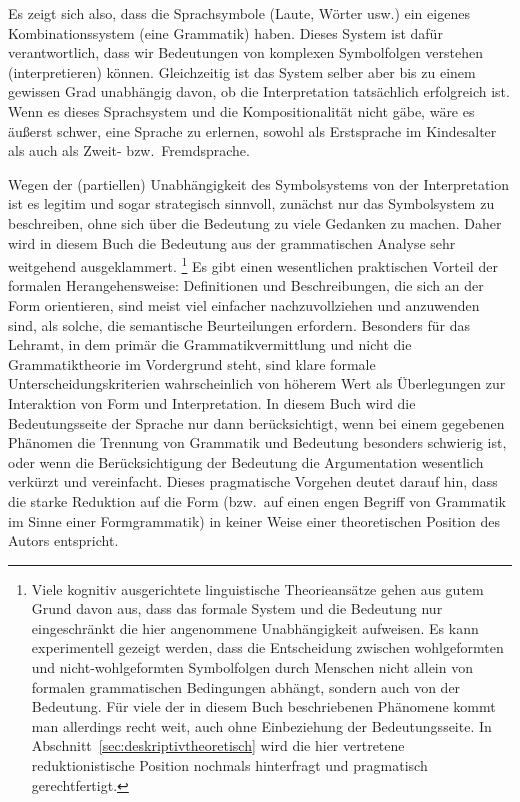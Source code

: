 \begin{exe}
  \ex\label{ex:dg7718}
  \begin{xlist}
  \end{xlist}
\end{exe}

Es zeigt sich also, dass die Sprachsymbole (Laute, Wörter usw.) ein eigenes Kombinationssystem (eine Grammatik) haben.
Dieses System ist dafür verantwortlich, dass wir Bedeutungen von komplexen Symbolfolgen verstehen (interpretieren) können.
Gleichzeitig ist das System selber aber bis zu einem gewissen Grad unabhängig davon, ob die Interpretation tatsächlich erfolgreich ist.
Wenn es dieses Sprachsystem und die Kompositionalität nicht gäbe, wäre es äußerst schwer, eine Sprache zu erlernen, sowohl als Erstsprache im Kindesalter als auch als Zweit- bzw.\ Fremdsprache.

Wegen der (partiellen) Unabhängigkeit des Symbolsystems von der Interpretation ist es legitim und sogar strategisch sinnvoll, zunächst nur das Symbolsystem zu beschreiben, ohne sich über die Bedeutung zu viele Gedanken zu machen.
Daher wird in diesem Buch die Bedeutung aus der grammatischen Analyse sehr weitgehend ausgeklammert.%
\footnote{Viele kognitiv ausgerichtete linguistische Theorieansätze gehen aus gutem Grund davon aus, dass das formale System und die Bedeutung nur eingeschränkt die hier angenommene Unabhängigkeit aufweisen.
Es kann \zB experimentell gezeigt werden, dass die Entscheidung zwischen wohlgeformten und nicht-wohlgeformten Symbolfolgen durch Menschen nicht allein von formalen grammatischen Bedingungen abhängt, sondern auch von der Bedeutung.
Für viele der in diesem Buch beschriebenen Phänomene kommt man allerdings recht weit, auch ohne Einbeziehung der Bedeutungsseite.
In Abschnitt~\ref{sec:deskriptivtheoretisch} wird die hier vertretene reduktionistische Position nochmals hinterfragt und pragmatisch gerechtfertigt.}
Es gibt einen wesentlichen praktischen Vorteil der formalen Herangehensweise:
Definitionen und Beschreibungen, die sich an der Form orientieren, sind meist viel einfacher nachzuvollziehen und anzuwenden sind, als solche, die semantische Beurteilungen erfordern.
Besonders für das Lehramt, in dem primär die Grammatikvermittlung und nicht die Grammatiktheorie im Vordergrund steht, sind klare formale Unterscheidungskriterien wahrscheinlich von höherem Wert als Überlegungen zur Interaktion von Form und Interpretation.
In diesem Buch wird die Bedeutungsseite der Sprache nur dann berücksichtigt, wenn bei einem gegebenen Phänomen die Trennung von Grammatik und Bedeutung besonders schwierig ist, oder wenn die Berücksichtigung der Bedeutung die Argumentation wesentlich verkürzt und vereinfacht.
Dieses pragmatische Vorgehen deutet darauf hin, dass die starke Reduktion auf die Form (bzw.\ auf einen engen Begriff von Grammatik im Sinne einer Formgrammatik) in keiner Weise einer theoretischen Position des Autors entspricht.

